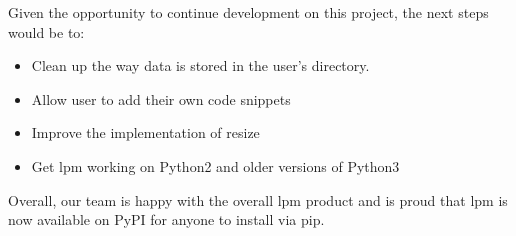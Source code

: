 \documentclass{article}
\begin{document}
Given the opportunity to continue development on this project, the next steps would be to:
\begin{itemize}
    \item Clean up the way data is stored in the user's directory.
    \item Allow user to add their own code snippets
    \item Improve the implementation of resize
    \item Get lpm working on Python2 and older versions of Python3
\end{itemize}

Overall, our team is happy with the overall lpm product and is proud that lpm is now available on PyPI for anyone to install via pip.
\end{document}
